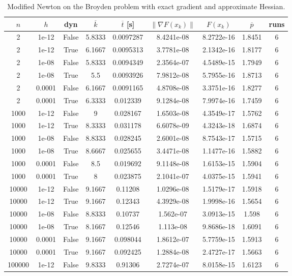 \begin{table}
\caption{Modified Newton on the Broyden problem with exact gradient and approximate Hessian.}
\label{tab:mn_broyden_ex_grad}
\begin{tabular}{ccccccccc}
\toprule
$n$ & $h$ & dyn & $\overline{k}$ & $\overline{t}$ [s] & $\|\nabla F(x_k)\|$ & $F(x_k)$ & $\overline{p}$ & runs \\
\midrule
2 & 1e-12 & False & 5.8333 & 0.0097287 & 8.4241e-08 & 8.2722e-16 & 1.8451 & 6 \\
2 & 1e-12 & True & 6.1667 & 0.0095313 & 3.7781e-08 & 2.1342e-16 & 1.8177 & 6 \\
2 & 1e-08 & False & 5.8333 & 0.0094349 & 2.3564e-07 & 4.5489e-15 & 1.7949 & 6 \\
2 & 1e-08 & True & 5.5 & 0.0093926 & 7.9812e-08 & 5.7955e-16 & 1.8713 & 6 \\
2 & 0.0001 & False & 6.1667 & 0.0091165 & 4.8708e-08 & 3.3751e-16 & 1.8277 & 6 \\
2 & 0.0001 & True & 6.3333 & 0.012339 & 9.1284e-08 & 7.9974e-16 & 1.7459 & 6 \\
1000 & 1e-12 & False & 9 & 0.028167 & 1.6503e-08 & 4.3549e-17 & 1.5762 & 6 \\
1000 & 1e-12 & True & 8.3333 & 0.031178 & 6.6078e-09 & 4.3243e-18 & 1.6874 & 6 \\
1000 & 1e-08 & False & 8.8333 & 0.028245 & 2.6001e-08 & 8.7543e-17 & 1.5715 & 6 \\
1000 & 1e-08 & True & 8.6667 & 0.025655 & 3.4471e-08 & 1.1477e-16 & 1.5882 & 6 \\
1000 & 0.0001 & False & 8.5 & 0.019692 & 9.1148e-08 & 1.6153e-15 & 1.5904 & 6 \\
1000 & 0.0001 & True & 8 & 0.023875 & 2.1041e-07 & 4.0375e-15 & 1.5941 & 6 \\
10000 & 1e-12 & False & 9.1667 & 0.11208 & 1.0296e-08 & 1.5179e-17 & 1.5918 & 6 \\
10000 & 1e-12 & True & 9.1667 & 0.12343 & 4.3929e-08 & 1.9998e-16 & 1.5654 & 6 \\
10000 & 1e-08 & False & 8.8333 & 0.10737 & 1.562e-07 & 3.0913e-15 & 1.598 & 6 \\
10000 & 1e-08 & True & 8.1667 & 0.12546 & 1.113e-08 & 9.8686e-18 & 1.6091 & 6 \\
10000 & 0.0001 & False & 9.1667 & 0.098044 & 1.8612e-07 & 5.7759e-15 & 1.5913 & 6 \\
10000 & 0.0001 & True & 9.1667 & 0.092425 & 1.2884e-08 & 2.4727e-17 & 1.5663 & 6 \\
100000 & 1e-12 & False & 9.8333 & 0.91306 & 2.7274e-07 & 8.0158e-15 & 1.6123 & 6 \\

\end{tabular}
\end{table}
